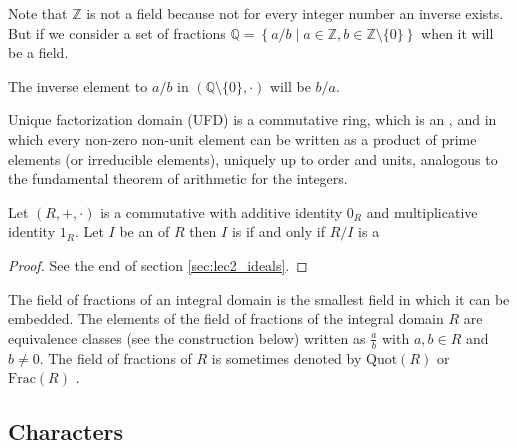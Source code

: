 \begin{appendices}
\begin{example}
  Note that $\mathbb{Z}$ is not a field because not for every integer
  number an inverse exists. But if we consider a set of fractions
  $\mathbb{Q} = \left\{a/b \mid a \in \mathbb{Z}, b \in
  \mathbb{Z}\setminus\{0\}\right\}$ when it will be a field.

  The
  inverse element to $a/b$  in
  $\left(\mathbb{Q}\setminus\{0\}, \cdot\right)$  will be $b/a$.
  \label{ex:field}
\end{example}

\begin{definition}
   Unique factorization domain (UFD) is a commutative ring, which is
   an , and in which every non-zero non-unit element
   can be written as a product of prime elements (or irreducible
   elements), uniquely up to order and units, analogous to the
   fundamental theorem of arithmetic for the integers. 
  \label{def:ufd}
\end{definition}

\begin{theorem}
  Let $\left(R, +, \cdot\right)$ is a commutative 
  with additive identity $0_R$ and multiplicative identity $1_R$. Let
  $I$ be an  of $R$ then $I$ is
   if and only if 
  $R/I$ is a 
  \label{thm:maxideal}
  \begin{proof}
    See the end of section \ref{sec:lec2_ideals}.
  \end{proof}
\end{theorem}

\begin{definition}
  The field of fractions of an integral domain is the smallest field
  in which it can be embedded. The elements of the field of fractions
  of the integral domain $R$ are equivalence classes
  (see the construction below) written as $\frac{a}{b}$ with $a, b \in
  R$ and $b\neq 0$. The field of
  fractions of $R$ is sometimes denoted by
  $\mathrm{Quot} (R)$ or $\mathrm {Frac}(R)$ \cite{wiki:fractionfield}. 
  \label{def:fractionfield}
\end{definition}

\subsection{Characters}


\end{appendices}
